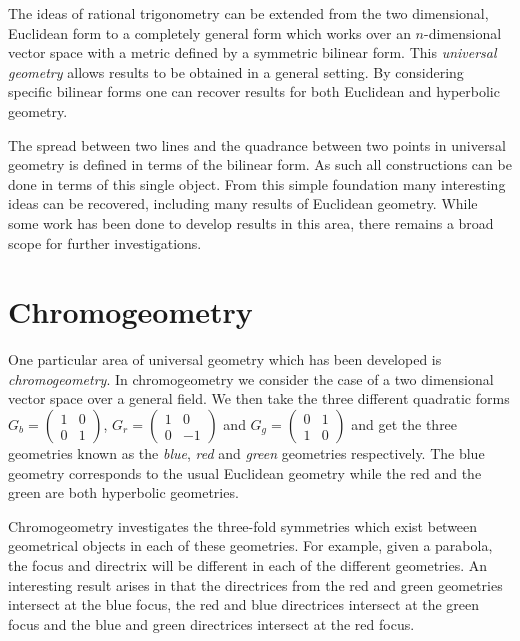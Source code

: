 The ideas of rational trigonometry can be extended from the two dimensional, Euclidean form to a completely general form which works over an $n$-dimensional vector space with a metric defined by a symmetric bilinear form\cite{wildberger:affine}.
This \emph{universal geometry} allows results to be obtained in a general setting.
By considering specific bilinear forms one can recover results for both Euclidean and hyperbolic geometry.

The spread between two lines and the quadrance between two points in universal geometry is defined in terms of the bilinear form.
As such all constructions can be done in terms of this single object.
From this simple foundation many interesting ideas can be recovered, including many results of Euclidean geometry.
While some work has been done to develop results in this area\cite{oneD}, there remains a broad scope for further investigations.

\section{Chromogeometry}

One particular area of universal geometry which has been developed is \emph{chromogeometry}\cite{wildberger:chromo}.
In chromogeometry we consider the case of a two dimensional vector space over a general field.
We then take the three different quadratic forms $G_b = \begin{pmatrix} 1 & 0 \\ 0 & 1 \end{pmatrix}$, $G_r = \begin{pmatrix} 1 & 0 \\ 0 & -1 \end{pmatrix}$ and $G_g = \begin{pmatrix} 0 & 1 \\ 1 & 0 \end{pmatrix}$ and get the three geometries known as the \emph{blue}, \emph{red} and \emph{green} geometries respectively.
The blue geometry corresponds to the usual Euclidean geometry while the red and the green are both hyperbolic geometries.

Chromogeometry investigates the three-fold symmetries which exist between geometrical objects in each of these geometries.
For example, given a parabola, the focus and directrix will be different in each of the different geometries.
An interesting result arises in that the directrices from the red and green geometries intersect at the blue focus, the red and blue directrices intersect at the green focus and the blue and green directrices intersect at the red focus\cite{wildberger:rel-conics}.

